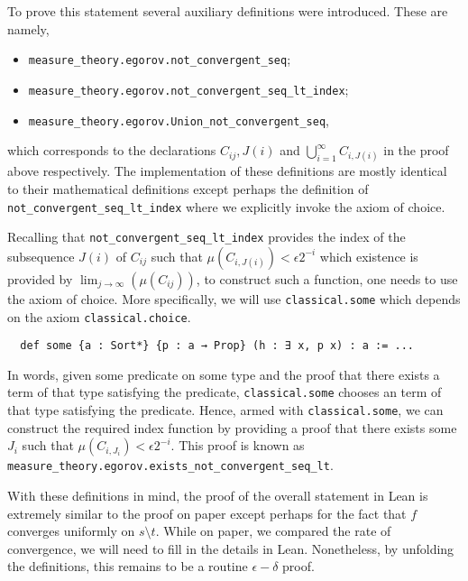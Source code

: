 \documentclass[]{article}
\theoremstyle{definition}
\begin{document}
To prove this statement several auxiliary definitions were introduced. These are 
namely,
\begin{itemize}
  \item \texttt{measure_theory.egorov.not_convergent_seq};
  \item \texttt{measure_theory.egorov.not_convergent_seq_lt_index};
  \item \texttt{measure_theory.egorov.Union_not_convergent_seq},
\end{itemize}
which corresponds to the declarations \(C_{ij}, J(i)\) and \(\bigcup_{i = 1}^\infty C_{i, J(i)}\) 
in the proof above respectively. The implementation of these definitions are mostly
identical to their mathematical definitions except perhaps the definition of 
\texttt{not_convergent_seq_lt_index} where we explicitly invoke 
the axiom of choice. 

Recalling that \texttt{not_convergent_seq_lt_index} provides the index 
of the subsequence \(J(i)\) of \(C_{ij}\) such that \(\mu(C_{i,J(i)}) < \epsilon 2^{-i}\)
which existence is provided by \(\lim_{j \to \infty}(\mu(C_{ij}))\), to construct 
such a function, one needs to use the axiom of choice. More specifically, 
we will use \texttt{classical.some} which depends on the axiom 
\texttt{classical.choice}.
\begin{verbatim}
  def some {a : Sort*} {p : a → Prop} (h : ∃ x, p x) : a := ...
\end{verbatim}
In words, given some predicate on some type and the proof that there exists a term 
of that type satisfying the predicate, \texttt{classical.some} chooses an 
term of that type satisfying the predicate. Hence, armed with \texttt{classical.some},
we can construct the required index function by providing a proof 
that there exists some \(J_i\) such that \(\mu(C_{i, J_i}) < \epsilon 2^{-i}\).
This proof is known as \texttt{measure_theory.egorov.exists_not_convergent_seq_lt}.

With these definitions in mind, the proof of the overall statement in Lean is 
extremely similar to the proof on paper except perhaps for the fact that \(f\)
converges uniformly on \(s \setminus t\). While on paper, we compared the rate 
of convergence, we will need to fill in the details in Lean. Nonetheless, by 
unfolding the definitions, this remains to be a routine \(\epsilon-\delta\) proof.
\end{document}
